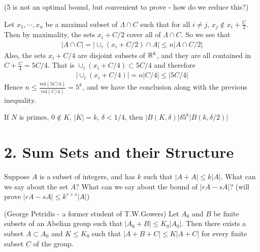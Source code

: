 \documentclass[10pt,a4paper]{report}
\newenvironment{proof}
{\begin{changemargin}{1cm}{0.5cm}
	}%
	{\end{changemargin}
}
\begin{document}
(5 is not an optimal bound, but convenient to prove - how do we reduce this?)
\begin{proof}
\pf Let $x_1, \cdots, x_n$ be a maximal subset of $\Lambda \cap C$ such that for all $i \neq j$, $x_j \notin x_i + \frac{C}{2}$. Then by maximality, the sets $x_i + C/2$ cover all of $\Lambda \cap C$. So we see that
\begin{align*}
|A \cap C|  = \big| \cup_i (x_i + C/2) \cap A \big| \leq n \big|A \cap C/2 \big|
\end{align*}
Also, the sets $x_i + C/4$ are disjoint subsets of $\mathbb{R}^k$, and they are all contained in $C + \frac{C}{4} = 5C/4$. That is $\cup_i (x_i + C/4) \subset 5C/4$ and therefore
\begin{align*}
\big| \cup_i (x_i + C/4) \big| = n \big| C/4 \big| \leq \big| 5C/4 \big|
\end{align*}
Hence $n \leq \frac{\text{vol}(5C/4)}{\text{vol}(C/4)} = 5^k$, and we have the conclusion along with the previous inequality.
\end{proof}
\s

 If $N$ is primes, $0\notin K$, $|K| =k$, $\delta <1/4$, then $|B(K,\delta)| \delta 5^k |B(k,\delta/2)|$
\s

\section*{2. Sum Sets and their Structure}

Suppose $A$ is a subset of integers, and has $k$ such that $|A+A | \leq k|A|$. What can we say about the set $A$? What can we say about the bound of $|rA-sA|$? (will prove $|rA-sA| \leq k^{r+s}|A|$)
\s

 (George Petridis - a former student of T.W.Gowers) Let $A_0$ and $B$ be finite subsets of an Abelian group such that $|A_0 + B | \leq K_0 |A_0| $. Then there exists a subset $A\subset A_0$ and $K\leq K_0$ such that $|A+B+C|\leq K|A+C|$ for every finite subset $C$ of the group.
\s
\end{document}
